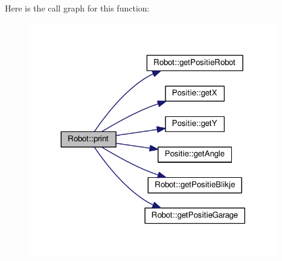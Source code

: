 Here is the call graph for this function\-:
\nopagebreak
\begin{figure}[H]
\begin{center}
\leavevmode
\includegraphics[width=308pt]{classRobot_a4895306b538817f9044c1b9b69e89781_cgraph}
\end{center}
\end{figure}


